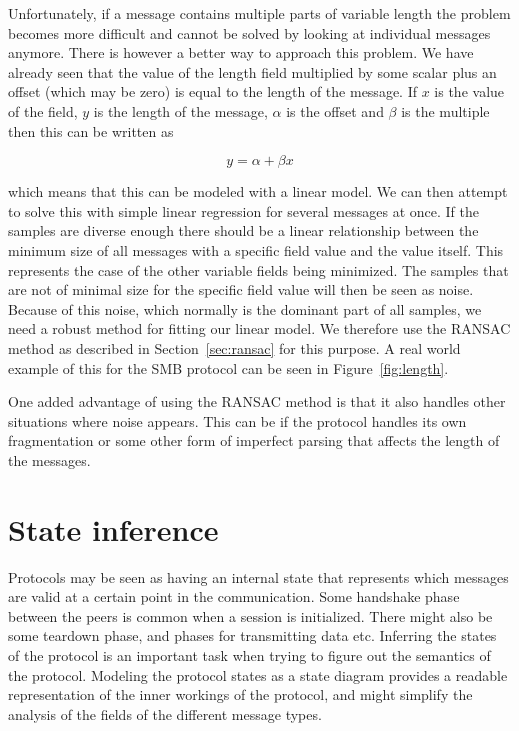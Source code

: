 \documentclass[a4paper]{report}
\begin{document}
Unfortunately, if a message contains multiple parts of variable length the
problem becomes more difficult and cannot be solved by looking at individual
messages anymore. There is however a better way to approach this problem. We
have already seen that the value of the length field multiplied by some scalar
plus an offset (which may be zero) is equal to the length of the message. If
$x$ is the value of the field, $y$ is the length of the message, $\alpha$ is the
offset and $\beta$ is the multiple then this can be written as

\[
    y = \alpha + \beta x
    \label{eq:linlength}
\]

which means that this can be modeled with a linear model. We can then attempt
to solve this with simple linear regression for several messages at once. If
the samples are diverse enough there should be a linear relationship between
the minimum size of all messages with a specific field value and the value
itself. This represents the case of the other variable fields being minimized.
The samples that are not of minimal size for the specific field value will then
be seen as noise. Because of this noise, which normally is the dominant part of
all samples, we need a robust method for fitting our linear model. We therefore
use the RANSAC method as described in Section~\ref{sec:ransac} for this
purpose. A real world example of this for the SMB protocol can be seen in
Figure~\ref{fig:length}.

One added advantage of using the RANSAC method is that it also handles other
situations where noise appears. This can be if the protocol handles its own
fragmentation or some other form of imperfect parsing that affects the length
of the messages.

\section{State inference}
Protocols may be seen as having an internal state that represents which
messages are valid at a certain point in the communication. Some handshake
phase between the peers is common when a session is initialized. There might
also be some teardown phase, and phases for transmitting data etc.
Inferring the states of the protocol is an important task when trying to
figure out the semantics of the protocol. Modeling the protocol states as
a state diagram provides a readable representation of the inner workings
of the protocol, and might simplify the analysis of the fields of the
different message types.
\end{document}
